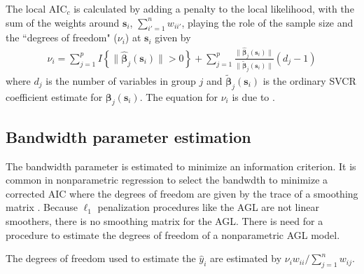 \documentclass[authoryear, review, 11pt]{elsarticle}
\begin{document}
	 The local $\text{AIC}_c$ is calculated by adding a penalty to the local likelihood, with the sum of the weights around $\bm{s}_i$, $\sum_{i'=1}^n w_{ii'}$, playing the role of the sample size and the ``degrees of freedom" ($\nu_i$) at $\bm{s}_i$ given by 
   \begin{align}
     \nu_i = \sum_{j=1}^p I \left\{ \| \hat{\bm{\beta}}_j(\bm{s}_i) \| > 0 \right\} + \sum_{j=1}^p \frac{\|\hat{\bm{\beta}}_j(\bm{s}_i)\|}{\|\tilde{\bm{\beta}}_j(\bm{s}_i)\|} (d_j - 1)
   \end{align}
   where $d_j$ is the number of variables in group $j$ and $\tilde{\bm{\beta}}_j(\bm{s}_i)$ is the ordinary SVCR coefficient estimate for $\bm{\beta}_j(\bm{s}_i)$. The equation for $\nu_i$ is due to \citep{Wang-Leng-2008}.
	
	
	\subsection{Bandwidth parameter estimation}
  
  The bandwidth parameter is estimated to minimize an information criterion. It is common in nonparametric regression to select the bandwdth to minimize a corrected AIC where the degrees of freedom are given by the trace of a smoothing matrix \citep{Hurvich:1998}. Because $\ell_1$ penalization procedures like the AGL are not linear smoothers, there is no smoothing matrix for the AGL. There is need for a procedure to estimate the degrees of freedom of a nonparametric AGL model.
  
  The degrees of freedom used to estimate the $\hat{y}_i$ are estimated by $\nu_i w_{ii} / \sum_{j=1}^n w_{ij}$.
\end{document}
